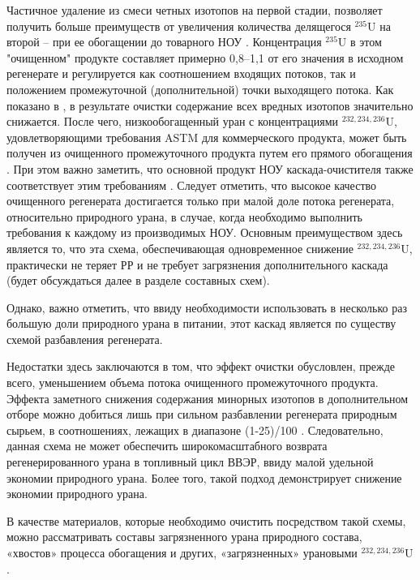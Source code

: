 Частичное удаление из смеси четных изотопов на первой стадии, позволяет получить больше преимуществ от увеличения количества делящегося $^{235}$U на второй -- при ее обогащении до товарного НОУ \cite{palkinSeparationUraniumIsotopes2010}.
Концентрация $^{235}$U в этом "очищенном" продукте составляет примерно 0,8--1,1 от его значения в исходном регенерате и регулируется как соотношением входящих потоков, так и положением промежуточной (дополнительной) точки выходящего потока.
Как показано в \cite{palkinSeparationUraniumIsotopes2010}, в результате очистки содержание всех вредных изотопов значительно снижается. После чего, низкообогащенный уран с концентрациями $^{232,234,236}$U, удовлетворяющими требования ASTM для коммерческого продукта, может быть получен из очищенного промежуточного продукта путем его прямого обогащения \cite{shopenSposobPolucheniyaRazbavitelya2008}.
При этом важно заметить, что основной продукт НОУ каскада-очистителя также соответствует этим требованиям \cite{palkinSeparationUraniumIsotopes2010}. Следует отметить, что высокое качество очищенного регенерата достигается только при малой доле потока регенерата, относительно природного урана, в случае, когда необходимо выполнить требования к каждому из производимых НОУ.
Основным преимуществом здесь является то, что эта схема, обеспечивающая одновременное снижение $^{232,234,236}$U, практически не теряет РР и не требует загрязнения дополнительного каскада (будет обсуждаться далее в разделе составных схем).

Однако, важно отметить, что ввиду необходимости использовать в несколько раз большую доли природного урана в питании, этот каскад является по существу схемой разбавления регенерата.

Недостатки здесь заключаются в том, что эффект очистки обусловлен, прежде всего, уменьшением объема потока очищенного промежуточного продукта. Эффекта заметного снижения содержания минорных изотопов в дополнительном отборе можно добиться лишь при сильном разбавлении регенерата природным сырьем, в соотношениях, лежащих в диапазоне (1-25)/100 \cite{palkinSeparationUraniumIsotopes2010, smirnovKaskadnyeShemyZadachah2012}.
Следовательно, данная схема не может обеспечить широкомасштабного возврата регенерированного урана в топливный цикл ВВЭР, ввиду малой удельной экономии природного урана.
Более того, такой подход демонстрирует снижение экономии природного урана.

В качестве материалов, которые необходимо очистить посредством такой схемы, можно рассматривать составы загрязненного урана природного состава, «хвостов» процесса обогащения и других, «загрязненных» урановыми $^{232,234,236}$U \cite{palkinSeparationUraniumIsotopes2010}. 


